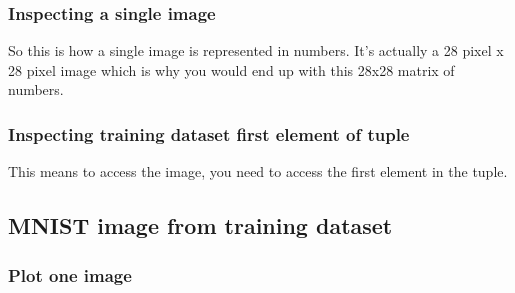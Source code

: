 \documentclass[]{book}
\newenvironment{Shaded}{\begin{snugshade}}{\end{snugshade}}
\newcommand{\CommentTok}[1]{\textcolor[rgb]{0.56,0.35,0.01}{\textit{#1}}}
\newcommand{\KeywordTok}[1]{\textcolor[rgb]{0.13,0.29,0.53}{\textbf{#1}}}
\newcommand{\NormalTok}[1]{#1}
\newcommand{\OperatorTok}[1]{\textcolor[rgb]{0.81,0.36,0.00}{\textbf{#1}}}
\begin{document}
\hypertarget{inspecting-a-single-image}{%
\subsubsection{Inspecting a single image}\label{inspecting-a-single-image}}

So this is how a single image is represented in numbers. It's actually a 28 pixel x 28 pixel image which is why you would end up with this 28x28 matrix of numbers.

\hypertarget{inspecting-training-dataset-first-element-of-tuple}{%
\subsubsection{Inspecting training dataset first element of tuple}\label{inspecting-training-dataset-first-element-of-tuple}}

This means to access the image, you need to access the first element in the tuple.

\begin{Shaded}
\end{Shaded}

\hypertarget{mnist-image-from-training-dataset}{%
\subsection{MNIST image from training dataset}\label{mnist-image-from-training-dataset}}

\begin{Shaded}
\end{Shaded}

\hypertarget{plot-one-image}{%
\subsubsection{Plot one image}\label{plot-one-image}}
\end{document}
